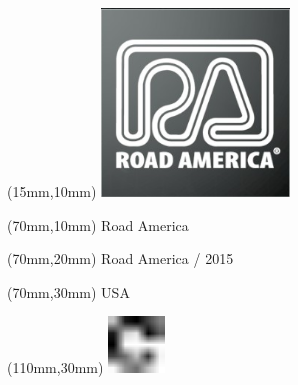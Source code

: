 \null\newpage
\begin{textblock*}{50mm}(15mm,10mm)%
\includegraphics[width=50mm]{LG/2015-05-20_00092.png}
\end{textblock*}
\begin{textblock*}{130mm}(70mm,10mm)%
{\fontsize{20}{20}\selectfont Road America}\\
\end{textblock*}
\begin{textblock*}{120mm}(70mm,20mm)%
{\fontsize{16}{16}\selectfont Road America / 2015}\\
\end{textblock*}
\begin{textblock*}{120mm}(70mm,30mm)%
{\fontsize{12}{12}\selectfont USA}
\end{textblock*}
\begin{textblock*}{30mm}(110mm,30mm)%
\centering
\includegraphics[height=15mm]{icons/fa-rotate-right.pdf}
\end{textblock*}
